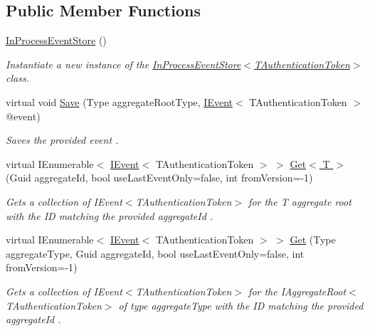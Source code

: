 \subsection*{Public Member Functions}
\begin{DoxyCompactItemize}
\item 
\hyperlink{classCqrs_1_1Events_1_1InProcessEventStore_a81534fc0086e307f46051c26111c47ab_a81534fc0086e307f46051c26111c47ab}{In\+Process\+Event\+Store} ()
\begin{DoxyCompactList}\small\item\em Instantiate a new instance of the \hyperlink{classCqrs_1_1Events_1_1InProcessEventStore_a81534fc0086e307f46051c26111c47ab_a81534fc0086e307f46051c26111c47ab}{In\+Process\+Event\+Store$<$\+T\+Authentication\+Token$>$} class. \end{DoxyCompactList}\item 
virtual void \hyperlink{classCqrs_1_1Events_1_1InProcessEventStore_ad9ddcf747084d8173bd703a6dd1b5041_ad9ddcf747084d8173bd703a6dd1b5041}{Save} (Type aggregate\+Root\+Type, \hyperlink{interfaceCqrs_1_1Events_1_1IEvent}{I\+Event}$<$ T\+Authentication\+Token $>$ @event)
\begin{DoxyCompactList}\small\item\em Saves the provided {\itshape event} . \end{DoxyCompactList}\item 
virtual I\+Enumerable$<$ \hyperlink{interfaceCqrs_1_1Events_1_1IEvent}{I\+Event}$<$ T\+Authentication\+Token $>$ $>$ \hyperlink{classCqrs_1_1Events_1_1InProcessEventStore_ab3df0015ad2f5950f5590f96384009e7_ab3df0015ad2f5950f5590f96384009e7}{Get$<$ T $>$} (Guid aggregate\+Id, bool use\+Last\+Event\+Only=false, int from\+Version=-\/1)
\begin{DoxyCompactList}\small\item\em Gets a collection of I\+Event$<$\+T\+Authentication\+Token$>$ for the {\itshape T} aggregate root with the ID matching the provided {\itshape aggregate\+Id} . \end{DoxyCompactList}\item 
virtual I\+Enumerable$<$ \hyperlink{interfaceCqrs_1_1Events_1_1IEvent}{I\+Event}$<$ T\+Authentication\+Token $>$ $>$ \hyperlink{classCqrs_1_1Events_1_1InProcessEventStore_a1a57a9059c5489fd891b479468b7e9ed_a1a57a9059c5489fd891b479468b7e9ed}{Get} (Type aggregate\+Type, Guid aggregate\+Id, bool use\+Last\+Event\+Only=false, int from\+Version=-\/1)
\begin{DoxyCompactList}\small\item\em Gets a collection of I\+Event$<$\+T\+Authentication\+Token$>$ for the I\+Aggregate\+Root$<$\+T\+Authentication\+Token$>$ of type {\itshape aggregate\+Type}  with the ID matching the provided {\itshape aggregate\+Id} . \end{DoxyCompactList}\item 

\end{DoxyCompactItemize}
